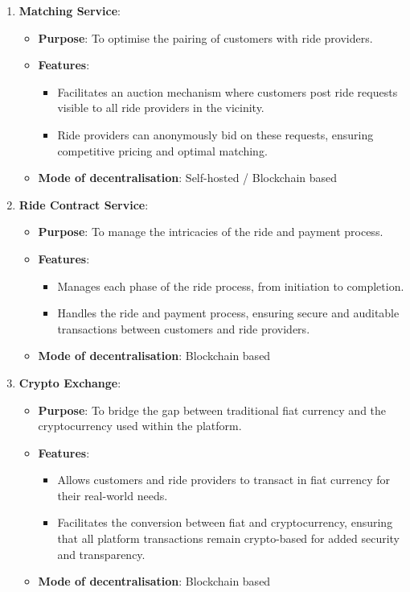 \begin{enumerate}
    \item \textbf{Matching Service}:
    \begin{itemize}
        \item \textbf{Purpose}: To optimise the pairing of customers with ride providers.
        \item \textbf{Features}:
        \begin{itemize}
            \item Facilitates an auction mechanism where customers post ride requests visible to all ride providers in the vicinity.
            \item Ride providers can anonymously bid on these requests, ensuring competitive pricing and optimal matching.
        \end{itemize}
        \item \textbf{Mode of decentralisation}: Self-hosted / Blockchain based
    \end{itemize}

    \item \textbf{Ride Contract Service}:
    \begin{itemize}
        \item \textbf{Purpose}: To manage the intricacies of the ride and payment process.
        \item \textbf{Features}:
        \begin{itemize}
            \item Manages each phase of the ride process, from initiation to completion.
            \item Handles the ride and payment process, ensuring secure and auditable transactions between customers and ride providers.
        \end{itemize}
        \item \textbf{Mode of decentralisation}: Blockchain based
    \end{itemize}

    \item \textbf{Crypto Exchange}:
    \begin{itemize}
        \item \textbf{Purpose}: To bridge the gap between traditional fiat currency and the cryptocurrency used within the platform.
        \item \textbf{Features}:
        \begin{itemize}
            \item Allows customers and ride providers to transact in fiat currency for their real-world needs.
            \item Facilitates the conversion between fiat and cryptocurrency, ensuring that all platform transactions remain crypto-based for added security and transparency.
        \end{itemize}
        \item \textbf{Mode of decentralisation}: Blockchain based
    \end{itemize}
\end{enumerate}

